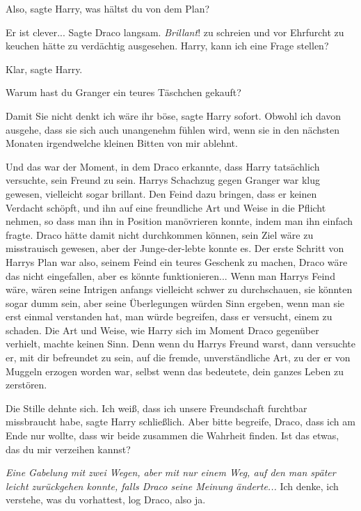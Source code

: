 \glqq Also\grqq{}, sagte Harry, \glqq was hältst du von dem Plan?\grqq{}

\glqq Er ist clever...\grqq{} Sagte Draco langsam. \emph{Brillant}! zu schreien
und vor Ehrfurcht zu keuchen hätte zu verdächtig ausgesehen. \glqq Harry, kann
ich eine Frage stellen?\grqq{}

\glqq Klar\grqq{}, sagte Harry.

\glqq Warum hast du Granger ein teures Täschchen gekauft?\grqq{}

\glqq Damit Sie nicht denkt ich wäre ihr böse\grqq{}, sagte Harry sofort. \glqq
Obwohl ich davon ausgehe, dass sie sich auch unangenehm fühlen wird, wenn sie in
den nächsten Monaten irgendwelche kleinen Bitten von mir ablehnt.\grqq{}

Und das war der Moment, in dem Draco erkannte, dass Harry tatsächlich versuchte,
sein Freund zu sein. Harrys Schachzug gegen Granger war klug gewesen, vielleicht
sogar brillant. Den Feind dazu bringen, dass er keinen Verdacht schöpft, und ihn
auf eine freundliche Art und Weise in die Pflicht nehmen, so dass man ihn in
Position manövrieren konnte, indem man ihn einfach fragte. Draco hätte damit
nicht durchkommen können, sein Ziel wäre zu misstrauisch gewesen, aber der
Junge-der-lebte konnte es. Der erste Schritt von Harrys Plan war also, seinem
Feind ein teures Geschenk zu machen, Draco wäre das nicht eingefallen, aber es
könnte funktionieren... Wenn man Harrys Feind wäre, wären seine Intrigen anfangs
vielleicht schwer zu durchschauen, sie könnten sogar dumm sein, aber seine
Überlegungen würden Sinn ergeben, wenn man sie erst einmal verstanden hat, man
würde begreifen, dass er versucht, einem zu schaden. Die Art und Weise, wie
Harry sich im Moment Draco gegenüber verhielt, machte keinen Sinn. Denn wenn du
Harrys Freund warst, dann versuchte er, mit dir befreundet zu sein, auf die
fremde, unverständliche Art, zu der er von Muggeln erzogen worden war, selbst
wenn das bedeutete, dein ganzes Leben zu zerstören.

Die Stille dehnte sich. \glqq Ich weiß, dass ich unsere Freundschaft furchtbar
missbraucht habe\grqq{}, sagte Harry schließlich. \glqq Aber bitte begreife,
Draco, dass ich am Ende nur wollte, dass wir beide zusammen die Wahrheit finden.
Ist das etwas, das du mir verzeihen kannst?\grqq{}

\emph{Eine Gabelung mit zwei Wegen, aber mit nur einem Weg, auf den man später
leicht zurückgehen konnte, falls Draco seine Meinung änderte...} \glqq Ich
denke, ich verstehe, was du vorhattest\grqq{}, log Draco, \glqq also ja.\grqq{}

